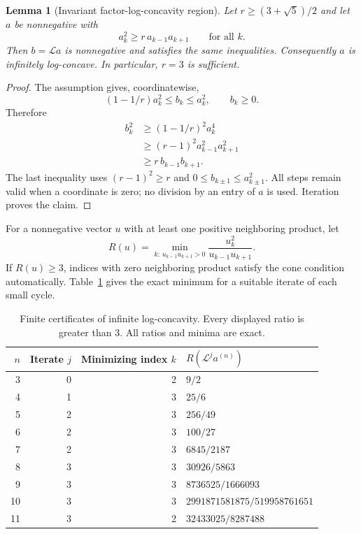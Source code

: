 \documentclass[11pt,a4paper]{article}
\newtheorem{lemma}[theorem]{Lemma}
\theoremstyle{definition}
\newcommand{\Lop}{\mathcal L}
\newcommand{\aco}{a^{(n)}}
\begin{document}
\begin{lemma}[Invariant factor-log-concavity region]\label{lem:cone}
Let $r\ge(3+\sqrt5)/2$ and let $a$ be nonnegative with
\begin{equation}\label{eq:rcone}
 a_k^2\ge r\,a_{k-1}a_{k+1}\qquad\text{for all }k.
\end{equation}
Then $b=\Lop a$ is nonnegative and satisfies the same inequalities.
Consequently $a$ is infinitely log-concave. In particular, $r=3$ is
sufficient.
\end{lemma}
\begin{proof}
The assumption gives, coordinatewise,
\[
 (1-1/r)a_k^2\le b_k\le a_k^2,
 \qquad b_k\ge0.
\]
Therefore
\begin{align*}
 b_k^2
 &\ge (1-1/r)^2a_k^4\\
 &\ge (r-1)^2a_{k-1}^2a_{k+1}^2\\
 &\ge r\,b_{k-1}b_{k+1}.
\end{align*}
The last inequality uses $(r-1)^2\ge r$ and
$0\le b_{k\pm1}\le a_{k\pm1}^2$. All steps remain valid when a coordinate
is zero; no division by an entry of $a$ is used. Iteration proves the claim.
\end{proof}

For a nonnegative vector $u$ with at least one positive neighboring
product, let
\[
 R(u)=\min_{k:\,u_{k-1}u_{k+1}>0}
        \frac{u_k^2}{u_{k-1}u_{k+1}}.
\]
If $R(u)\ge3$, indices with zero neighboring product satisfy the cone
condition automatically. Table~\ref{tab:cone} gives the exact minimum
for a suitable iterate of each small cycle.

\begin{table}[htbp]
\centering
\begin{tabular}{@{}rrrl@{}}
\toprule
$n$ & Iterate $j$ & Minimizing index $k$ & $R(\Lop^j\aco)$\\
\midrule
3 & 0 & 2 & $9/2$\\
4 & 1 & 3 & $25/6$\\
5 & 2 & 3 & $256/49$\\
6 & 2 & 3 & $100/27$\\
7 & 2 & 3 & $6845/2187$\\
8 & 3 & 3 & $30926/5863$\\
9 & 3 & 3 & $8736525/1666093$\\
10 & 3 & 3 & $2991871581875/519958761651$\\
11 & 3 & 2 & $32433025/8287488$\\
\bottomrule
\end{tabular}
\caption{Finite certificates of infinite log-concavity. Every displayed
ratio is greater than $3$. All ratios and minima are exact.}
\label{tab:cone}
\end{table}
\end{document}

